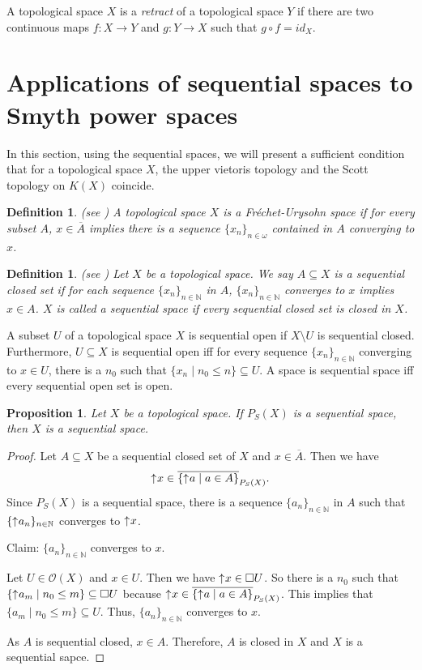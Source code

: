 \documentclass[preprint,12pt]{elsarticle}
\numberwithin{equation}{section}
\newtheorem{proposition}[theorem]{Proposition}
\newtheorem{definition}[theorem]{Definition}
\newcommand{\up}{\mathord{\uparrow}\hspace{0.05em}}
\begin{document}
\quad A topological space $X$ is a {\em retract} of a topological space $Y$ if there are two continuous maps $f:X\longrightarrow Y$ and $g:Y\longrightarrow X$ such that $g\circ f=id_{X}$.




\section{Applications of sequential spaces to Smyth power spaces}\label{sec:fm}



In this section, using the sequential spaces, we will present a sufficient condition that for a topological space $X$, the upper vietoris topology and the Scott topology on $K(X)$ coincide.

\begin{definition}{\rm (see \cite{RE77}) A topological space $X$ is a Fr\'echet-Urysohn space if for every subset $A$, $x\in \overline{A}$ implies there is a sequence $\{x_{n}\}_{n\in\omega}$ contained in $A$ converging to $x$.}
\end{definition}

\begin{definition}{\rm (see \cite{RE77}) Let $X$ be a topological space. We say $A\subseteq X$ is a sequential closed set if for each sequence $\{x_{n}\}_{n\in\mathbb{N}}$ in $A$, $\{x_{n}\}_{n\in\mathbb{N}}$ converges to $x$ implies $x\in A$. $X$ is called a sequential space if every sequential closed set is closed in $X$.}
\end{definition}

A subset $U$ of a topological space $X$ is sequential open if $X\setminus U$ is sequential closed. Furthermore, $U\subseteq X$ is sequential open iff for every sequence $\{x_{n}\}_{n\in\mathbb{N}}$ converging to $x\in U$, there is a $n_{0}$ such that $\{x_{n}\mid n_{0}\leq n\}\subseteq U$. A space is sequential space iff every sequential open set is open.

\begin{proposition} {\rm Let $X$ be a topological space. If $P_{S}(X)$ is a sequential space, then $X$ is a sequential space.}
\end{proposition}

\begin{proof} Let $A\subseteq X$ be a sequential closed set of $X$ and $x\in \overline{A}$. Then we have $$\up x\in \overline{\{\up a\mid a\in A\}}_{P_{S}(X)}.$$ Since $P_{S}(X)$ is a sequential space, there is a sequence $\{a_{n}\}_{n\in\mathbb{N}}$ in $A$ such that $\{\up a_{n}\}_{n\in\mathbb{N}}$ converges to $\up x$.

Claim: $\{a_{n}\}_{n\in\mathbb{N}}$ converges to $x$.

Let $U\in\mathcal{O}(X)$ and $x\in U$. Then we have $\up x\in\Box U$. So there is a $n_{0}$ such that $\{\up a_{m}\mid n_{0}\leq m\}\subseteq\Box U$ because $\up x\in \overline{\{\up a\mid a\in A\}}_{P_{S}(X)}$. This implies that $\{a_{m}\mid n_{0}\leq m\}\subseteq U$. Thus, $\{a_{n}\}_{n\in\mathbb{N}}$ converges to $x$.

As $A$ is sequential closed, $x\in A$. Therefore, $A$ is closed in $X$ and $X$ is a sequential sapce. \end{proof}
\end{document}
